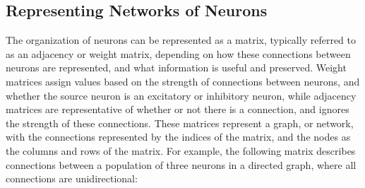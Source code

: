 \documentclass[11pt,titlepage]{article}
\begin{document}
\subsection{Representing Networks of Neurons}
The organization of neurons can be represented as a matrix, typically referred to as an adjacency or weight matrix, depending on how these connections between neurons are represented, and what information is useful and preserved. Weight matrices assign values based on the strength of connections between neurons, and whether the source neuron is an excitatory or inhibitory neuron, while adjacency matrices are representative of whether or not there is a connection, and ignores the strength of these connections. These matrices represent a graph, or network, with the connections represented by the indices of the matrix, and the nodes as the columns and rows of the matrix. For example, the following matrix describes connections between a population of three neurons in a directed graph, where all connections are unidirectional:\par
\end{document}
